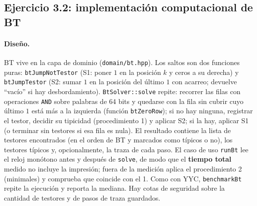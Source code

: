 \documentclass[11pt, a4paper]{article}
\theoremstyle{definition}
\theoremstyle{plain}
\begin{document}
\subsection{Ejercicio 3.2: implementación computacional de BT}\label{sec:bt-impl}

\paragraph{Diseño.} BT vive en la capa de dominio (\texttt{domain/bt.hpp}). Los
saltos son dos funciones puras: \texttt{btJumpNotTestor} (S1: poner $1$ en la
posición $k$ y ceros a su derecha) y \texttt{btJumpTestor} (S2: sumar $1$ en la
posición del último $1$ con acarreo; devuelve ``vacío'' si hay desbordamiento).
\texttt{BtSolver::solve} repite: recorrer las filas con operaciones \texttt{AND}
sobre palabras de 64 bits y quedarse con la fila sin cubrir cuyo último $1$
está más a la izquierda (función \texttt{btZeroRow}); si no hay ninguna,
registrar el testor, decidir su tipicidad (procedimiento 1) y aplicar S2; si
la hay, aplicar S1 (o terminar sin testores si esa fila es nula). El resultado
contiene la lista de testores encontrados (en el orden de BT y marcados como
típicos o no), los testores típicos y, opcionalmente, la traza de cada paso. El
caso de uso \texttt{runBt} lee el reloj monótono antes y después de
\texttt{solve}, de modo que el \textbf{tiempo total} medido no incluye la
impresión; fuera de la medición aplica el procedimiento 2 (minimales) y
comprueba que coincide con el 1. Como con YYC, \texttt{benchmarkBt} repite la
ejecución y reporta la mediana. Hay cotas de seguridad sobre la cantidad de
testores y de pasos de traza guardados.
\end{document}
